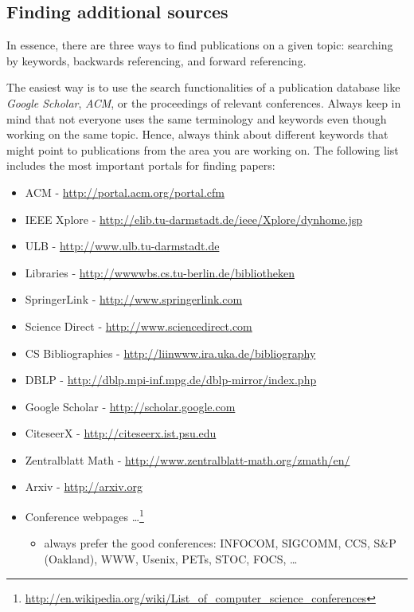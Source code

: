 \documentclass{article}
\begin{document}
\subsection{Finding additional sources}

In essence, there are three ways to find publications on a given topic: searching by keywords, backwards referencing, and forward referencing.

The easiest way is to use the search functionalities of a publication database like \emph{Google Scholar}, \emph{ACM}, or the proceedings of relevant conferences.
Always keep in mind that not everyone uses the same terminology and keywords even though working on the same topic.
Hence, always think about different keywords that might point to publications from the area you are working on.
The following list includes the most important portals for finding papers:

\begin{itemize}
	\item ACM - \url{http://portal.acm.org/portal.cfm}
	\item IEEE Xplore - \url{http://elib.tu-darmstadt.de/ieee/Xplore/dynhome.jsp}
	\item ULB - \url{http://www.ulb.tu-darmstadt.de}
	\item Libraries - \url{http://wwwwbs.cs.tu-berlin.de/bibliotheken}
	\item SpringerLink - \url{http://www.springerlink.com}
	\item Science Direct - \url{http://www.sciencedirect.com}
	\item CS Bibliographies - \url{http://liinwww.ira.uka.de/bibliography}
	\item DBLP - \url{http://dblp.mpi-inf.mpg.de/dblp-mirror/index.php}
	\item Google Scholar - \url{http://scholar.google.com}
	\item CiteseerX - \url{http://citeseerx.ist.psu.edu}
	\item Zentralblatt Math - \url{http://www.zentralblatt-math.org/zmath/en/}
	\item Arxiv - \url{http://arxiv.org}
	\item Conference webpages \dots \footnote{\url{http://en.wikipedia.org/wiki/List_of_computer_science_conferences}}
	\begin{itemize}
		\item always prefer the good conferences: INFOCOM, SIGCOMM, CCS, S\&P (Oakland), WWW, Usenix, PETs, STOC, FOCS, \dots
	\end{itemize}
\end{itemize}
\end{document}

